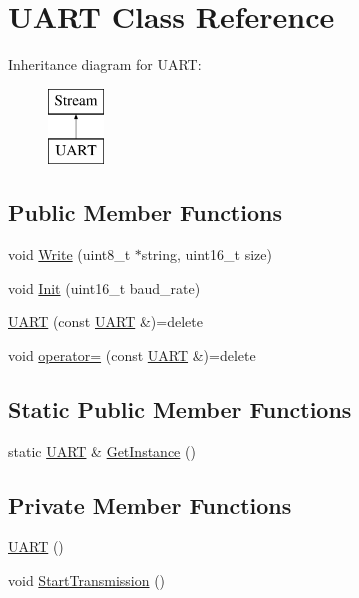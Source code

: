 \hypertarget{class_u_a_r_t}{\section{U\-A\-R\-T Class Reference}
\label{class_u_a_r_t}
}
Inheritance diagram for U\-A\-R\-T\-:\begin{figure}[H]
\begin{center}
\leavevmode
\includegraphics[height=2.000000cm]{class_u_a_r_t}
\end{center}
\end{figure}
\subsection*{Public Member Functions}
\begin{DoxyCompactItemize}
\item 
void \hyperlink{class_u_a_r_t_a8bb77ca27b4e17d608d2743313625ac4}{Write} (uint8\-\_\-t $\ast$string, uint16\-\_\-t size)
\item 
void \hyperlink{class_u_a_r_t_aed659ee8bc31ba966144d1a522506a7b}{Init} (uint16\-\_\-t baud\-\_\-rate)
\item 
\hyperlink{class_u_a_r_t_a97debffc29b178c09b104f4542298a36}{U\-A\-R\-T} (const \hyperlink{class_u_a_r_t}{U\-A\-R\-T} \&)=delete
\item 
void \hyperlink{class_u_a_r_t_a843ab7fc20f5ce5f030d2ca5ee98d6b6}{operator=} (const \hyperlink{class_u_a_r_t}{U\-A\-R\-T} \&)=delete
\end{DoxyCompactItemize}
\subsection*{Static Public Member Functions}
\begin{DoxyCompactItemize}
\item 
static \hyperlink{class_u_a_r_t}{U\-A\-R\-T} \& \hyperlink{class_u_a_r_t_a745c8f35f3ca3ab6359cedda3e640777}{Get\-Instance} ()
\end{DoxyCompactItemize}
\subsection*{Private Member Functions}
\begin{DoxyCompactItemize}
\item 
\hyperlink{class_u_a_r_t_a68e7e88d2a13f5da85f0fde1ef98515f}{U\-A\-R\-T} ()
\item 
void \hyperlink{class_u_a_r_t_a0569d0267f8045907cedb527b5082fe0}{Start\-Transmission} ()
\end{DoxyCompactItemize}

